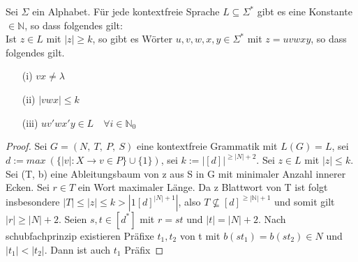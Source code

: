 \newpage
{}
    Sei \(\Sigma\) ein Alphabet. Für jede kontextfreie Sprache \(L \subseteq \Sigma^*\) gibt es eine Konstante \(\in \mathbb{N}\), so dass folgendes gilt:\\ Ist \(z \in L\) mit \(|z| \geq k\), so gibt es Wörter \(u, v, w, x, y \in \Sigma^*\) mit \(z = uvwxy\), so dass folgendes gilt.
    \begin{itemize}
        \item [(i)] \(vx \not = \lambda\)
        \item [(ii)]\(|vwx| \leq k\)
        \item [(iii)] \(uv'wx'y\in L \quad \forall i \in \mathbb{N}_0\)
    \end{itemize}
    \begin{proof}
            Sei \(G = (N,\ T,\ P,\ S)\) eine kontextfreie Grammatik mit \(L(G) = L\), sei \(d:=max\ (\{|v|: X \to v \in P\} \cup \{1\})\), sei \(k := |[d]|^{\geq |N| + 2}\). Sei \(z \in L\) mit \(|z|\leq k\). Sei (T, b) eine Ableitungsbaum von z aus S in G mit minimaler Anzahl innerer Ecken. Sei \(r \in T \) ein Wort maximaler Länge. Da z Blattwort von T ist folgt insbesondere \(|T| \leq |z| \leq k > |1[d]^{|N|+1}|\), also \(T \not \subseteq [d]^{\geq |\mathbb{N}|+1}\) und somit gilt \(|r|\geq |N|+2\). Seien \(s, t\in[d^*]\) mit \(r = st\) und \(|t| = |N|+2\). Nach schubfachprinzip existieren Präfixe \(t_1, t_2\) von t mit \(b(st_1) = b(st_2)\in N\) und \(|t_1|<|t_2|\). Dann ist auch \(t_1\) Präfix 
    \end{proof}
